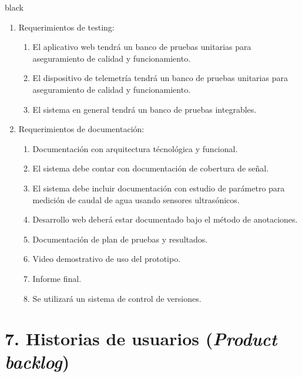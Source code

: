 \documentclass[
11pt, %
codirector, %
]{charter}
\begin{document}
\begin{consigna}{black}
\begin{enumerate}
\item Requerimientos de testing:
	\begin{enumerate}
		\item El aplicativo web tendrá un banco de pruebas unitarias para aseguramiento de calidad y funcionamiento.
		\item El dispositivo de telemetría tendrá un banco de pruebas unitarias para aseguramiento de calidad y funcionamiento.
		\item El sistema en general tendrá un banco de pruebas integrables.
	\end{enumerate}

\item Requerimientos de documentación:
	\begin{enumerate}
		\item Documentación con arquitectura técnológica y funcional.
		\item El sistema debe contar con documentación de cobertura de señal. 
		\item El sistema debe incluir documentación con estudio de parámetro para medición de caudal de agua usando sensores ultrasónicos.
		\item Desarrollo web deberá estar documentado bajo el método de anotaciones.
		\item Documentación de plan de pruebas y resultados.
		\item Video demostrativo de uso del prototipo.
		\item Informe final.
		\item Se utilizará un sistema de control de versiones.
	\end{enumerate}

\end{enumerate}

\end{consigna}

\section{7. Historias de usuarios (\textit{Product backlog})}
\label{sec:backlog}
\end{document}
